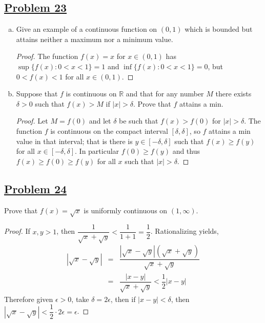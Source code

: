 \documentclass[10pt,letterpaper]{article}
\begin{document}
	\subsection*{{\color{purple}\underline{Problem 23}}}
	\begin{enumerate}[(a)]
		\item Give an example of a continuous function on $(0, 1)$ which is bounded
		but attains neither a maximum nor a minimum value.
		\begin{proof}
			The function $f(x) = x$ for $x \in (0, 1)$ has $\sup\{f(x) : 0 < x < 1\} = 1$
			and $\inf\{f(x) : 0 < x < 1 \} = 0$, but $0 < f(x) < 1$ for all $x \in (0, 1)$.
		\end{proof}
		
		\item Suppose that $f$ is continuous on $\mathbb{R}$ and that for any number
		$M$ there exists $\delta > 0$ such that $f(x) > M$ if $|x| > \delta$. Prove 
		that $f$ attains a min.
		\begin{proof}
			Let $M = f(0)$ and let $\delta$ be such that $f(x) > f(0)$ for $|x| > \delta$.
			The function $f$ is continuous on the compact interval $[\delta, \delta]$, 
			so $f$ attains a min value in that interval; that is there is $y \in [-\delta, \delta]$
			such that $f(x) \geq f(y)$ for all $x \in [-\delta, \delta]$. In particular
			$f(0) \geq f(y)$ and thus $f(x) \geq f(0) \geq f(y)$ for all $x$ such that
			$|x| > \delta$.
		\end{proof}
	\end{enumerate}
	
	\subsection*{{\color{purple}\underline{Problem 24}}}
	Prove that $f(x) = \sqrt{x}$ is uniformly continuous on $(1, \infty)$. 
	\begin{proof}
		If $x, y > 1$, then $\dfrac{1}{\sqrt{x} + \sqrt{y}} < \dfrac{1}{1 + 1} = \dfrac{1}{2}$.
		Rationalizing yields,
		\begin{eqnarray*}
			|\sqrt{x} - \sqrt{y}| &=& \dfrac{|\sqrt{x} - \sqrt{y}|(\sqrt{x} + \sqrt{y})}{\sqrt{x} + \sqrt{y}} \\
			&=& \dfrac{|x - y|}{\sqrt{x} + \sqrt{y}} < \dfrac{1}{2}|x - y|
		\end{eqnarray*}
		Therefore given $\epsilon > 0$, take $\delta = 2\epsilon$, then if $|x - y| < \delta$, then
		$|\sqrt{x} - \sqrt{y}| < \dfrac{1}{2} \cdot 2 \epsilon = \epsilon$.
	\end{proof}
	
\end{document}
